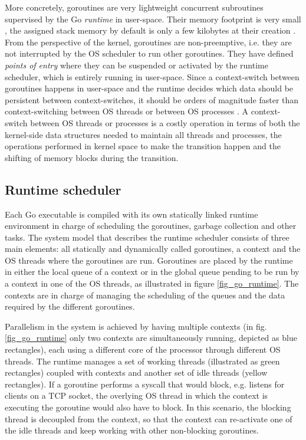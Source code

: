 More concretely, goroutines are very lightweight concurrent subroutines  supervised by the Go \textit{runtime} in user-space. Their memory footprint is very small \cite{2013ContextSwitching}, the assigned stack memory by default is only a few kilobytes at their creation \cite{Cox-Buday2017}. From the perspective of the kernel, goroutines are non-preemptive, i.e. they are not interrupted by the OS scheduler to run other goroutines. They have defined \textit{points of entry} where they can be suspended or activated by the runtime scheduler, which is entirely running in user-space. Since a context-switch between goroutines happens in user-space and the runtime decides which data should be persistent between context-switches, it should be orders of magnitude faster than context-switching between OS threads \cite{Cox-Buday2017} or between OS processes \cite{Kerrisk2010}. A context-switch between OS threads or processes is a costly operation in terms of both the kernel-side data structures needed to maintain all threads and processes, the operations performed in kernel space to make the transition happen and the shifting of memory blocks during the transition.

\subsection{Runtime scheduler}
Each Go executable is compiled with its own statically linked runtime environment in charge of scheduling the goroutines, garbage collection and other tasks. The system model that describes the runtime scheduler consists of three main elements: all statically and dynamically called goroutines, a context and the OS threads where the goroutines are run. Goroutines are placed by the runtime in either the local queue of a context or in the global queue pending to be run by a context in one of the OS threads, as illustrated in figure \ref{fig_go_runtime}. The contexts are in charge of managing the scheduling of the queues and the data required by the different goroutines.

Parallelism in the system is achieved by having multiple contexts (in fig. \ref{fig_go_runtime} only two contexts are simultaneously running, depicted as blue rectangles), each using a different core of the processor through different OS threads. The runtime manages a set of working threads (illustrated as green rectangles) coupled with contexts and another set of idle threads (yellow rectangles).  If a goroutine performs a syscall that would block, e.g. listens for clients on a TCP socket, the overlying OS thread in which the context is executing the goroutine would also have to block. In this scenario, the blocking thread is decoupled from the context, so that the context can re-activate one of the idle threads and keep working with other non-blocking goroutines.

